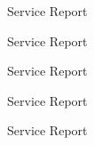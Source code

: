 \documentclass{beamer}
\begin{document}
\begin{frame}{Service Report}

\end{frame}

\begin{frame}{Service Report}

\end{frame}

\begin{frame}{Service Report}

\end{frame}

\begin{frame}{Service Report}

\end{frame}

\begin{frame}{Service Report}

\end{frame}
\end{document}
